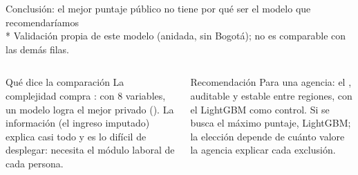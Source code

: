\begin{frame}{Conclusión: el mejor puntaje público no tiene por qué ser el modelo que recomendaríamos}
  \label{p:concl}
  \small
  \centering
  \\[0.5mm]
  {\scriptsize\color{gris} * Validación propia de este modelo (anidada, sin Bogotá); no es comparable con las demás filas.}
  \vspace{2mm}
  \begin{columns}[T]
    \begin{block}{Qué dice la comparación}
      \small
      La complejidad compra : con 8 variables, un modelo logra el mejor privado (\KgPrivMax). La información (el ingreso imputado) explica casi todo y es lo difícil de desplegar: necesita el módulo laboral de cada persona.
    \end{block}
    \begin{block}{Recomendación}
      \small
      Para una agencia: el , auditable y estable entre regiones, con el LightGBM como control. Si se busca el máximo puntaje, LightGBM; la elección depende de cuánto valore la agencia explicar cada exclusión.
    \end{block}
  \end{columns}
\end{frame}


